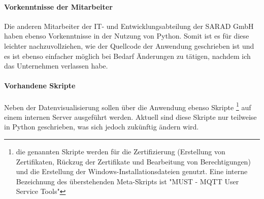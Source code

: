 \documentclass[letterpaper,11pt,leqno]{article}
\begin{document}
\paragraph{Vorkenntnisse der Mitarbeiter}Die anderen Mitarbeiter der IT- und Entwicklungsabteilung
der SARAD GmbH haben ebenso Vorkenntnisse in der Nutzung von Python. Somit ist es für diese leichter
nachzuvollziehen, wie der Quellcode der Anwendung geschrieben ist und es ist ebenso einfacher
möglich bei Bedarf Änderungen zu tätigen, nachdem ich das Unternehmen verlassen habe.
\paragraph{Vorhandene Skripte}Neben der Datenvisualisierung sollen über die Anwendung ebenso Skripte
\footnote{die genannten Skripte werden für die Zertifizierung (Erstellung von Zertifikaten, Rückzug
der Zertifikate und Bearbeitung von Berechtigungen) und die Erstellung der
Windows-Installationsdateien genutzt. Eine interne Bezeichnung des überstehenden Meta-Skripts ist
"MUST - MQTT User Service Tools"} auf einem internen Server ausgeführt werden. Aktuell sind diese
Skripte nur teilweise in Python geschrieben, was sich jedoch zukünftig ändern wird.
\end{document}

